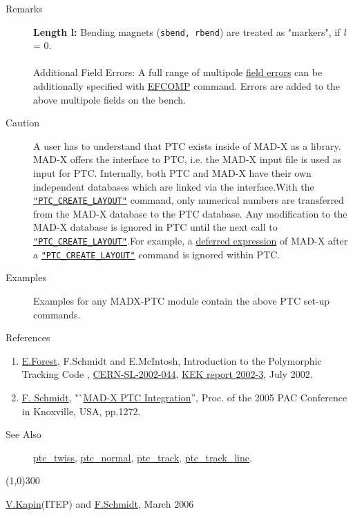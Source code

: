 \begin{description}
	\item[Remarks]
	\text{  \\}	%
		
	 \textbf{Length l: }Bending magnets (\texttt{sbend,  rbend}) are treated as "markers", if \textit{l} = 0.
\\
\\ Additional Field Errors: A full range of multipole \href{../error/error_field.html}{ field errors} can be additionally specified with \href{../error/error_field.html#efcomp}{ EFCOMP} command. Errors are added to the above multipole  fields on the bench.


	\item[Caution] A user has to understand that PTC exists inside of MAD-X as a          library. MAD-X offers the interface to PTC, i.e. the MAD-X input file is          used as input for PTC. Internally, both PTC and MAD-X have their own          independent databases which are linked via the interface.With the \texttt{\hyperlink{PTC_CREATE_LAYOUT}{"PTC\_CREATE\_LAYOUT"}}         command, only numerical numbers are          transferred from the MAD-X          database to the PTC database. Any modification to the MAD-X          database is ignored in PTC until the next call to \texttt{\hyperlink{PTC_CREATE_LAYOUT}{"PTC\_CREATE\_LAYOUT"}}.For example, a         \href{../Introduction/expression.html#defer}{         deferred expression} of MAD-X after a         \texttt{\hyperlink{PTC_CREATE_LAYOUT}{"PTC\_CREATE\_LAYOUT"}}         command is ignored within PTC. 
	\item[Examples] Examples for any MADX-PTC module contain the above PTC set-up          commands. 

	\item[References] 
\end{description}
\begin{enumerate}
	\item \href{E.Forest}{E.Forest}, F.Schmidt and E.McIntosh,  Introduction to the Polymorphic Tracking Code ,          \href{http://cern.ch/madx/doc/sl-2002-044.pdf}{CERN-SL-2002-044},         \href{http://ccdb4fs.kek.jp/cgi-bin/img/allpdf?200302020}{KEK report          2002-3}, July 2002.
	\item \href{F.Schmidt}{F. Schmidt}, "`\href{http://cern.ch/madx/doc/MPPE012.pdf}{MAD-X PTC Integration}'',          Proc. of the 2005 PAC Conference in Knoxville, USA, pp.1272.
\end{enumerate}
\begin{description}
	\item[See Also] 
	\text{ \\}	%
	
	\href{../ptc_twiss/ptc_twiss.html}{ptc\_twiss}, \href{../ptc_normal/ptc_normal.html}{ptc\_normal}, \href{../ptc_track/ptc_track.html}{ ptc\_track},         \href{../ptc_track_line/ptc_track_line.html}{ptc\_track\_line}.
\end{description}

\line(1,0){300}

\href{mailto:kapin@itep.ru}{  V.Kapin}(ITEP) and \href{mailto:Frank.Schmidt@cern.ch}{  F.Schmidt}, March  2006

